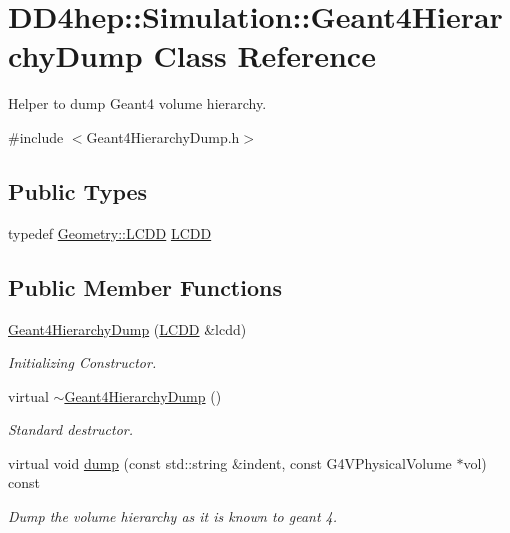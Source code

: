 \hypertarget{class_d_d4hep_1_1_simulation_1_1_geant4_hierarchy_dump}{}\section{D\+D4hep\+:\+:Simulation\+:\+:Geant4\+Hierarchy\+Dump Class Reference}
\label{class_d_d4hep_1_1_simulation_1_1_geant4_hierarchy_dump}


Helper to dump Geant4 volume hierarchy.  




{\ttfamily \#include $<$Geant4\+Hierarchy\+Dump.\+h$>$}

\subsection*{Public Types}
\begin{DoxyCompactItemize}
\item 
typedef \hyperlink{class_d_d4hep_1_1_geometry_1_1_l_c_d_d}{Geometry\+::\+L\+C\+DD} \hyperlink{class_d_d4hep_1_1_simulation_1_1_geant4_hierarchy_dump_a4b0ebc3e2346d0ff1c40293d4610f560}{L\+C\+DD}
\end{DoxyCompactItemize}
\subsection*{Public Member Functions}
\begin{DoxyCompactItemize}
\item 
\hyperlink{class_d_d4hep_1_1_simulation_1_1_geant4_hierarchy_dump_afcdcc1f61c37b8fcc8c005677b9c2383}{Geant4\+Hierarchy\+Dump} (\hyperlink{class_d_d4hep_1_1_simulation_1_1_geant4_hierarchy_dump_a4b0ebc3e2346d0ff1c40293d4610f560}{L\+C\+DD} \&lcdd)
\begin{DoxyCompactList}\small\item\em Initializing Constructor. \end{DoxyCompactList}\item 
virtual \hyperlink{class_d_d4hep_1_1_simulation_1_1_geant4_hierarchy_dump_a47d7985316101ad8cbe95c844746f847}{$\sim$\+Geant4\+Hierarchy\+Dump} ()
\begin{DoxyCompactList}\small\item\em Standard destructor. \end{DoxyCompactList}\item 
virtual void \hyperlink{class_d_d4hep_1_1_simulation_1_1_geant4_hierarchy_dump_a47fcb3062abf62695a7cff1bb61fa1e1}{dump} (const std\+::string \&indent, const G4\+V\+Physical\+Volume $\ast$vol) const
\begin{DoxyCompactList}\small\item\em Dump the volume hierarchy as it is known to geant 4. \end{DoxyCompactList}\end{DoxyCompactItemize}
